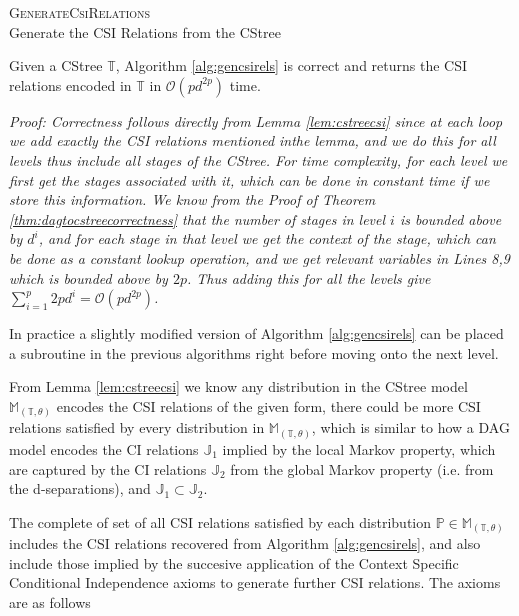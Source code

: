 \documentclass{tufte-book}
\begin{document}
\begin{Definition}
\begin{algorithm}
\caption{\textsc{GenerateCsiRelations} \\ Generate the CSI Relations from the CStree}

   \end{algorithm}


\begin{theorem}\label{thm:gencsirelscorrectness}
Given a CStree $\mathbb{T}$, Algorithm \ref{alg:gencsirels} is correct and returns the CSI relations encoded in $\mathbb{T}$ in $\mathcal{O}(pd^{2p})$ time.
\end{theorem}
\textit{Proof: Correctness follows directly from Lemma \ref{lem:cstreecsi} since at each loop we add exactly the CSI relations mentioned inthe lemma, and we do this for all levels thus include all stages of the CStree. For time complexity, for each level we first get the stages associated with it, which can be done in constant time if we store this information. We know from the Proof of Theorem \ref{thm:dagtocstreecorrectness} that the number of stages in level $i$ is bounded above by $d^i$, and for each stage in that level we get the context of the stage, which can be done as a constant lookup operation, and we get relevant variables in Lines 8,9 which is bounded above by $2p$. Thus adding this for all the levels give $\sum_{i=1}^p 2pd^i = \mathcal{O}(pd^{2p})$.
}


In practice a slightly modified version of Algorithm \ref{alg:gencsirels} can be placed a subroutine in the previous algorithms right before moving onto the next level.


From Lemma \ref{lem:cstreecsi} we know any distribution in the CStree model \(\mathbb{M}_{(\mathbb{T},\theta)}\) encodes the CSI relations of the given form, there could be more CSI relations satisfied by every distribution in \(\mathbb{M}_{(\mathbb{T},\theta)}\), which is similar to how a DAG model encodes the CI relations \(\mathbb{J}_1\) implied by the local Markov property, which are captured by the CI relations \(\mathbb{J}_2\) from the global Markov property (i.e. from the d-separations), and \(\mathbb{J}_1 \subset \mathbb{J}_2\).


The complete of set of all CSI relations satisfied by each distribution \(\mathbb{P} \in \mathbb{M}_{(\mathbb{T},\theta)}\) includes the CSI relations recovered from Algorithm \ref{alg:gencsirels}, and also include those implied by the succesive application of the Context Specific Conditional Independence axioms to generate further CSI relations. The axioms are as follows



\end{Definition}
\end{document}
